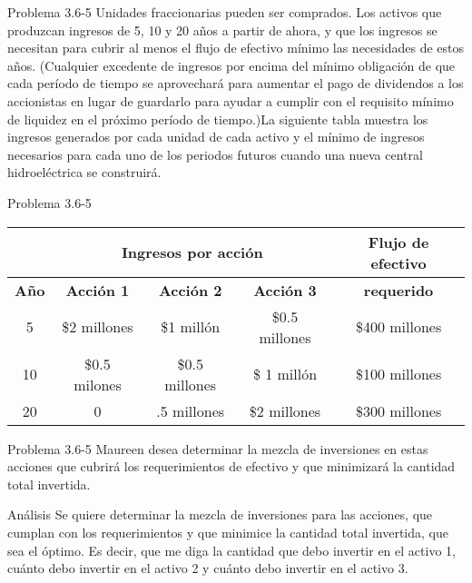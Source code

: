 \documentclass{beamer}
\begin{document}
\begin{frame}[t,fragile]{Problema 3.6-5 }
Unidades fraccionarias pueden ser comprados. Los activos que produzcan ingresos de 5, 10 y 20 años a partir de ahora, y que los ingresos se necesitan para cubrir al menos el flujo de efectivo mínimo las necesidades de estos años. (Cualquier excedente de ingresos por encima del mínimo obligación de que cada período de tiempo se aprovechará para aumentar el pago de dividendos a los accionistas en lugar de guardarlo para ayudar a cumplir con el requisito mínimo de liquidez en el próximo período de tiempo.)La siguiente tabla muestra  los ingresos generados por cada unidad de cada activo y el  mínimo de ingresos necesarios para cada uno de los periodos futuros cuando una nueva central hidroeléctrica se construirá.
\end{frame}
\begin{frame}[t,fragile]{Problema 3.6-5 }
\begin{tabular}{|c|c|c|c|c|}
\hline 
 & \multicolumn{3}{c|}{\textbf{Ingresos por acción}} & \textbf{{Flujo de efectivo} }\\ 
\hline 
\textbf{Año} & \textbf{Acción 1} & \textbf{Acción 2} & \textbf{Acción 3} & \textbf{requerido} \\ 
\hline 
5 & \$2 millones & \$1 millón & \$0.5 millones & \$400 millones \\ 
\hline 
10 & \$0.5 milones & \$0.5 millones & \$ 1 millón & \$100 millones \\ 
\hline 
20 & 0 & \1.5 millones & \$2 millones & \$300 millones \\ 
\hline 
\end{tabular} 
\end{frame}

\begin{frame}[t,fragile]{Problema 3.6-5 }
Maureen desea determinar la mezcla de inversiones en estas acciones que cubrirá los requerimientos de efectivo y que minimizará la cantidad total invertida.
\end{frame}

\begin{frame}[fragile]{Análisis}
Se quiere determinar la mezcla de inversiones  para las acciones, que cumplan con los requerimientos  y que minimice la cantidad total invertida, que sea el óptimo. Es decir, que me diga la cantidad que debo invertir en el activo 1, cuánto debo invertir en el activo 2 y cuánto debo invertir en el activo 3.

\end{frame}
\end{document}
